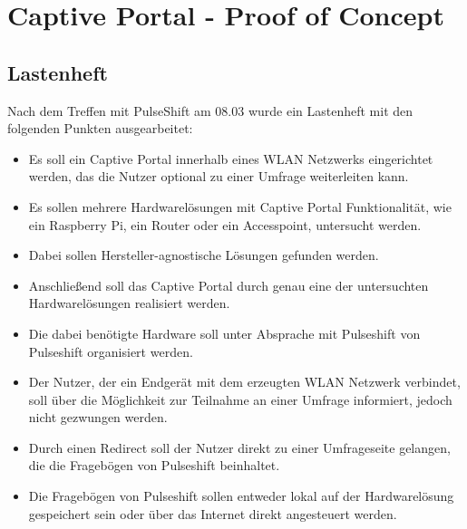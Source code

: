 \section{Captive Portal - Proof of Concept}
\label{section:realisation:captive_portal}
\subsection{Lastenheft}
Nach dem Treffen mit PulseShift am 08.03 wurde ein Lastenheft mit den folgenden Punkten ausgearbeitet:
\begin{itemize}
\item Es soll ein Captive Portal innerhalb eines WLAN Netzwerks eingerichtet werden, das die Nutzer optional zu einer Umfrage weiterleiten kann.
\item Es sollen mehrere Hardwarelösungen mit Captive Portal Funktionalität, wie ein Raspberry Pi, ein Router oder ein Accesspoint, untersucht werden. 
\item Dabei sollen Hersteller-agnostische Lösungen gefunden werden.
\item Anschließend soll das Captive Portal durch genau eine der untersuchten Hardwarelösungen realisiert werden.
\item Die dabei benötigte Hardware soll unter Absprache mit Pulseshift von Pulseshift organisiert werden.
\item Der Nutzer, der ein Endgerät mit dem erzeugten WLAN Netzwerk verbindet, soll über die Möglichkeit zur Teilnahme an einer Umfrage informiert, jedoch nicht gezwungen werden.
\item Durch einen Redirect soll der Nutzer direkt zu einer Umfrageseite gelangen, die die Fragebögen von Pulseshift beinhaltet.
\item Die Fragebögen von Pulseshift sollen entweder lokal auf der Hardwarelösung gespeichert sein oder über das Internet direkt angesteuert werden.
\end{itemize}

